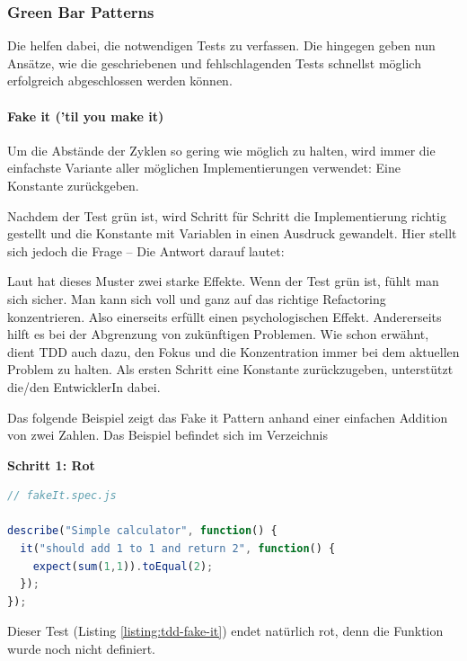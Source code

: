 \newpage
\subsubsection{Green Bar Patterns}

Die  helfen dabei, die notwendigen Tests zu verfassen. Die  hingegen geben nun Ansätze, wie die geschriebenen und fehlschlagenden Tests schnellst möglich erfolgreich abgeschlossen werden können.

\paragraph{Fake it ('til you make it)}

Um die Abstände der  Zyklen so gering wie möglich zu halten, wird immer die einfachste Variante aller möglichen Implementierungen verwendet: Eine Konstante zurückgeben.

Nachdem der Test grün ist, wird Schritt für Schritt die Implementierung richtig gestellt und die Konstante mit Variablen in einen Ausdruck gewandelt. Hier stellt sich jedoch die Frage  -- Die Antwort darauf lautet: 

Laut \cite[152]{Beck:2003} hat dieses Muster zwei starke Effekte. Wenn der Test grün ist, fühlt man sich sicher. Man kann sich voll und ganz auf das richtige Refactoring konzentrieren. Also einerseits erfüllt  einen psychologischen Effekt. Andererseits hilft es bei der Abgrenzung von zukünftigen Problemen. Wie schon erwähnt, dient TDD auch dazu, den Fokus und die Konzentration immer bei dem aktuellen Problem zu halten. Als ersten Schritt eine Konstante zurückzugeben, unterstützt die/den EntwicklerIn dabei.

Das folgende Beispiel zeigt das Fake it Pattern anhand einer einfachen Addition von zwei Zahlen. Das Beispiel befindet sich im Verzeichnis 

\vspace{0.5cm}
\textbf{Schritt 1: Rot}
\begin{lstlisting}[language=JavaScript, caption=TDD - Fake It, label=listing:tdd-fake-it]
// fakeIt.spec.js

describe("Simple calculator", function() {
  it("should add 1 to 1 and return 2", function() {
    expect(sum(1,1)).toEqual(2);
  });
});
\end{lstlisting}
Dieser Test (Listing \ref{listing:tdd-fake-it}) endet natürlich rot, denn die Funktion  wurde noch nicht definiert.

